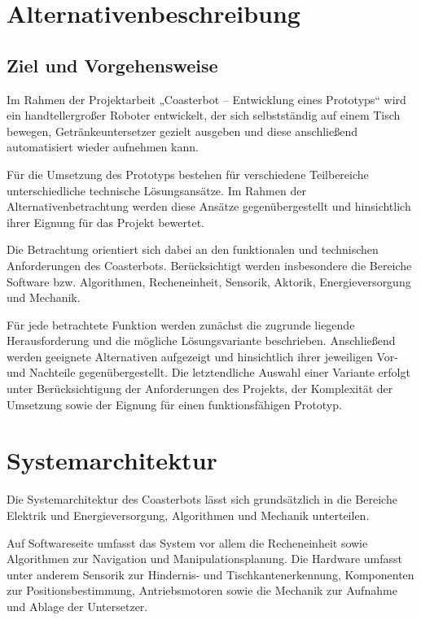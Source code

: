 \documentclass[
  a4paper,
  12pt,
  DIV=12,        %
  parskip=half,  %
  headings=small %
]{scrartcl}
\theoremstyle{definition}
\theoremstyle{definition}
\begin{document}
\newpage

\tableofcontents

\newpage

\section{Alternativenbeschreibung}\label{alternativenbeschreibung}

\subsection{Ziel und Vorgehensweise}\label{ziel-und-vorgehensweise}

Im Rahmen der Projektarbeit „Coasterbot -- Entwicklung eines Prototyps``
wird ein handtellergroßer Roboter entwickelt, der sich selbstständig auf
einem Tisch bewegen, Getränkeuntersetzer gezielt ausgeben und diese
anschließend automatisiert wieder aufnehmen kann.

Für die Umsetzung des Prototyps bestehen für verschiedene Teilbereiche
unterschiedliche technische Lösungsansätze. Im Rahmen der
Alternativenbetrachtung werden diese Ansätze gegenübergestellt und
hinsichtlich ihrer Eignung für das Projekt bewertet.

Die Betrachtung orientiert sich dabei an den funktionalen und
technischen Anforderungen des Coasterbots. Berücksichtigt werden
insbesondere die Bereiche Software bzw. Algorithmen, Recheneinheit,
Sensorik, Aktorik, Energieversorgung und Mechanik.

Für jede betrachtete Funktion werden zunächst die zugrunde liegende
Herausforderung und die mögliche Lösungsvariante beschrieben.
Anschließend werden geeignete Alternativen aufgezeigt und hinsichtlich
ihrer jeweiligen Vor- und Nachteile gegenübergestellt. Die letztendliche
Auswahl einer Variante erfolgt unter Berücksichtigung der Anforderungen
des Projekts, der Komplexität der Umsetzung sowie der Eignung für einen
funktionsfähigen Prototyp.

\section{Systemarchitektur}\label{systemarchitektur}

Die Systemarchitektur des Coasterbots lässt sich grundsätzlich in die
Bereiche Elektrik und Energieversorgung, Algorithmen und Mechanik
unterteilen.

Auf Softwareseite umfasst das System vor allem die Recheneinheit sowie
Algorithmen zur Navigation und Manipulationsplanung. Die Hardware
umfasst unter anderem Sensorik zur Hindernis- und Tischkantenerkennung,
Komponenten zur Positionsbestimmung, Antriebsmotoren sowie die Mechanik
zur Aufnahme und Ablage der Untersetzer.
\end{document}
